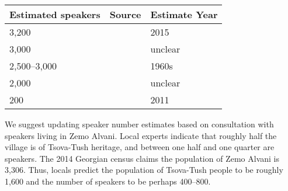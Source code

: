 \documentclass[portrait,fontscale=0.285,a0paper]{baposter2}
\begin{document}
\begin{poster}
{\begin{center}
{\footnotesize
\begin{tabular}{@{}p{0.5in}p{1.5in}p{0.45in}@{}}
\toprule
\textbf{Estimated speakers} \raggedright & \textbf{Source}    \raggedright                                        & \textbf{Estimate Year}   \\ \midrule
3,200                         & \citealt{simonsethnologue2018}   \raggedright                          & 2015             \\
3,000                         & \citealt{comrielinguistic2008,salmineneurope2007,holiskytsova-tush1994}  \raggedright & unclear          \\
2,500--3,000                  & \citealt{kolgabats2001}                  \raggedright                       & 1960s            \\
2,000                         & \citealt{savxelisvili2001}               \raggedright                   & unclear          \\
200                          & \citealt{harrisperception2011}   \raggedright                          & 2011             \\ \bottomrule
\end{tabular}
}
\end{center}

\begin{singlespace}We suggest updating speaker number estimates based on consultation with speakers living in Zemo Alvani. Local experts indicate that roughly half the village is of Tsova-Tush heritage, and between one half and one quarter are speakers. The 2014 Georgian census claims the
population of Zemo Alvani is 3,306. Thus, locals predict the population of Tsova-Tush people to be roughly
1,600 and the number of speakers to be perhaps 400–800.
\end{singlespace}\\




}


\end{poster}
\end{document}
